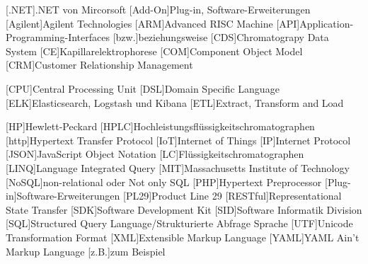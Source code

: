 \begin{acronym}[OPC-UA]

[.NET]{.NET von Mircorsoft}
[Add-On]{Plug-in, Software-Erweiterungen}
[Agilent]{Agilent Technologies}
[ARM]{Advanced RISC Machine}
[API]{Application-Programming-Interfaces}
[bzw.]{beziehungsweise}
[CDS]{Chromatograpy Data System}
[CE]{Kapillarelektrophorese}
[COM]{Component Object Model}
[CRM]{Customer Relationship Management}

[CPU]{Central Processing Unit}
[DSL]{Domain Specific Language}
[ELK]{Elasticsearch, Logstash und Kibana}
[ETL]{Extract, Transform and Load}


[HP]{Hewlett-Peckard}
[HPLC]{Hochleistungsflüssigkeitschromatographen}
[http]{Hypertext Transfer Protocol}
[IoT]{Internet of Things}
[IP]{Internet Protocol}
[JSON]{JavaScript Object Notation}
[LC]{Flüssigkeitschromatographen}
[LINQ]{Language Integrated Query}
[MIT]{Massachusetts Institute of Technology}
[NoSQL]{non-relational oder Not only SQL}
[PHP]{Hypertext Preprocessor}
[Plug-in]{Software-Erweiterungen}
[PL29]{Product Line 29}
[RESTful]{Representational State Transfer}
[SDK]{Software Development Kit}
[SID]{Software Informatik Division}
[SQL]{Structured Query Language/Strukturierte Abfrage Sprache}
[UTF]{Unicode Transformation Format}
[XML]{Extensible Markup Language}
[YAML]{YAML Ain't Markup Language}
[z.B.]{zum Beispiel}



\end{acronym}
